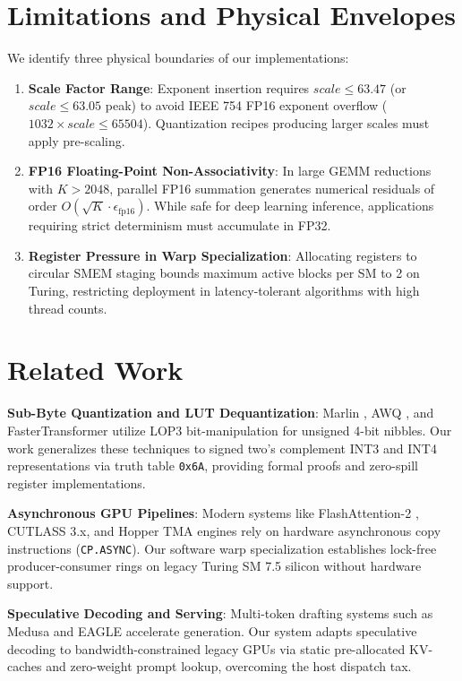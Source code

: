 \documentclass[10pt,twocolumn,letterpaper]{article}
\begin{document}
\section{Limitations and Physical Envelopes}
We identify three physical boundaries of our implementations:
\begin{enumerate}
  \item \textbf{Scale Factor Range}: Exponent insertion requires $scale \le 63.47$ (or $scale \le 63.05$ peak) to avoid IEEE 754 FP16 exponent overflow ($1032 \times scale \le 65504$). Quantization recipes producing larger scales must apply pre-scaling.
  \item \textbf{FP16 Floating-Point Non-Associativity}: In large GEMM reductions with $K > 2048$, parallel FP16 summation generates numerical residuals of order $O(\sqrt{K} \cdot \epsilon_{\text{fp16}})$. While safe for deep learning inference, applications requiring strict determinism must accumulate in FP32.
  \item \textbf{Register Pressure in Warp Specialization}: Allocating registers to circular SMEM staging bounds maximum active blocks per SM to 2 on Turing, restricting deployment in latency-tolerant algorithms with high thread counts.
\end{enumerate}

\section{Related Work}
\textbf{Sub-Byte Quantization and LUT Dequantization}: Marlin \cite{frantar2023marlin}, AWQ \cite{lin2024awq}, and FasterTransformer utilize LOP3 bit-manipulation for unsigned 4-bit nibbles. Our work generalizes these techniques to signed two's complement INT3 and INT4 representations via truth table \texttt{0x6A}, providing formal proofs and zero-spill register implementations.

\textbf{Asynchronous GPU Pipelines}: Modern systems like FlashAttention-2 \cite{dao2023flashattention2}, CUTLASS 3.x, and Hopper TMA engines rely on hardware asynchronous copy instructions (\texttt{CP.ASYNC}). Our software warp specialization establishes lock-free producer-consumer rings on legacy Turing SM 7.5 silicon without hardware support.

\textbf{Speculative Decoding and Serving}: Multi-token drafting systems such as Medusa \cite{cai2024medusa} and EAGLE \cite{li2024eagle} accelerate generation. Our system adapts speculative decoding to bandwidth-constrained legacy GPUs via static pre-allocated KV-caches and zero-weight prompt lookup, overcoming the host dispatch tax.
\end{document}
